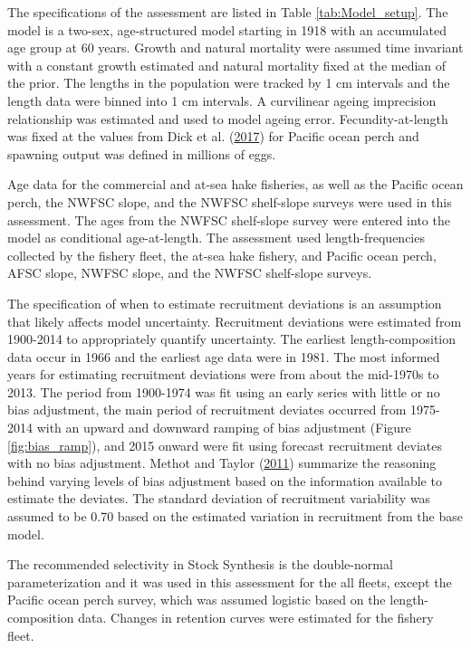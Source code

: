 \documentclass[12pt,]{article}
\begin{document}
The specifications of the assessment are listed in Table
\ref{tab:Model_setup}. The model is a two-sex, age-structured model
starting in 1918 with an accumulated age group at 60 years. Growth and
natural mortality were assumed time invariant with a constant growth
estimated and natural mortality fixed at the median of the prior. The
lengths in the population were tracked by 1 cm intervals and the length
data were binned into 1 cm intervals. A curvilinear ageing imprecision
relationship was estimated and used to model ageing error.
Fecundity-at-length was fixed at the values from Dick et al.
(\protect\hyperlink{ref-dick_meta-analysis_2017}{2017}) for Pacific
ocean perch and spawning output was defined in millions of eggs.

Age data for the commercial and at-sea hake fisheries, as well as the
Pacific ocean perch, the NWFSC slope, and the NWFSC shelf-slope surveys
were used in this assessment. The ages from the NWFSC shelf-slope survey
were entered into the model as conditional age-at-length. The assessment
used length-frequencies collected by the fishery fleet, the at-sea hake
fishery, and Pacific ocean perch, AFSC slope, NWFSC slope, and the NWFSC
shelf-slope surveys.

The specification of when to estimate recruitment deviations is an
assumption that likely affects model uncertainty. Recruitment deviations
were estimated from 1900-2014 to appropriately quantify uncertainty. The
earliest length-composition data occur in 1966 and the earliest age data
were in 1981. The most informed years for estimating recruitment
deviations were from about the mid-1970s to 2013. The period from
1900-1974 was fit using an early series with little or no bias
adjustment, the main period of recruitment deviates occurred from
1975-2014 with an upward and downward ramping of bias adjustment (Figure
\ref{fig:bias_ramp}), and 2015 onward were fit using forecast
recruitment deviates with no bias adjustment. Methot and Taylor
(\protect\hyperlink{ref-methot_adjusting_2011}{2011}) summarize the
reasoning behind varying levels of bias adjustment based on the
information available to estimate the deviates. The standard deviation
of recruitment variability was assumed to be 0.70 based on the estimated
variation in recruitment from the base model.

The recommended selectivity in Stock Synthesis is the double-normal
parameterization and it was used in this assessment for the all fleets,
except the Pacific ocean perch survey, which was assumed logistic based
on the length-composition data. Changes in retention curves were
estimated for the fishery fleet.
\end{document}
